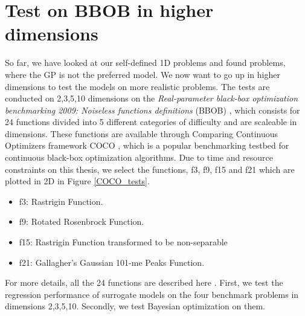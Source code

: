 \section{Test on BBOB in higher dimensions}
So far, we have looked at our self-defined 1D problems and found problems, where the GP is not the
preferred model. We now want to go up in higher dimensions to test the models on more realistic
problems. The tests are conducted on 2,3,5,10 dimensions on the \textit{Real-parameter black-box
optimization benchmarking 2009: Noiseless functions definitions} (BBOB) \cite{hansen2009real}, which
consists for 24 functions divided into 5 different categories of difficulty and are scaleable in dimensions. 
These functions are available through Comparing Continuous Optimizers framework COCO \cite{COCO}, which is 
a popular benchmarking testbed for continuous black-box optimization algorithms. Due to time and resource
constraints on this thesis, we select the functions, f3, f9, f15 and f21 which are plotted in 2D in Figure \ref{COCO_tests}.
\begin{itemize}[noitemsep]
  \item f3: Rastrigin Function.
  \item f9: Rotated Rosenbrock Function.
  \item f15: Rastrigin Function transformed to be non-separable
  \item f21: Gallagher’s Gaussian 101-me Peaks Function.
\end{itemize}
For more details, all the 24 functions are described here \cite{hansen2009real}. First, we test the
regression performance of surrogate models on the four benchmark problems in dimensions 2,3,5,10.
Secondly, we test Bayesian optimization on them. 

